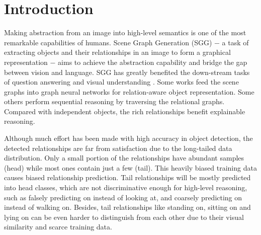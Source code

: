 \documentclass{article}
\begin{document}
\section{Introduction}
\label{sec:intro}
Making abstraction from an image into high-level semantics is one of the most remarkable capabilities of humans. Scene Graph Generation (SGG) \cite{xu2017scene} $-$ a task of extracting objects and their  relationships in an image to form a graphical representation $-$ aims to achieve the abstraction capability and bridge the gap between vision and language. SGG has greatly benefited the down-stream tasks of question answering \cite{norcliffe2018learning,Zhu2020Mucko} and visual understanding \cite{shi2019explainable,Jiang2020DualVD}. Some works \cite{Zhu2020Mucko,Jiang2020DualVD} feed the scene graphs into graph neural networks for relation-aware object representation. Some others \cite{hudson2019learning} perform sequential reasoning by traversing the relational graphs. Compared with independent objects, the rich relationships benefit  explainable reasoning. 




Although much effort has been made  with high accuracy in object detection, the detected relationships are far from satisfaction due to the long-tailed data distribution. Only a small portion of the relationships have abundant samples (head) while most ones contain just a few (tail). This heavily biased training data causes biased relationship prediction. Tail relationships will be mostly predicted into head classes, which are not  discriminative  enough for high-level reasoning, such as falsely predicting {\ttfamily on} instead of {\ttfamily looking at}, and coarsely predicting {\ttfamily on} instead of {\ttfamily walking on}.  Besides, tail relationships like {\ttfamily standing on}, {\ttfamily sitting on} and {\ttfamily lying on} can be even harder to distinguish from each other due to their visual similarity and scarce training data.
\end{document}
